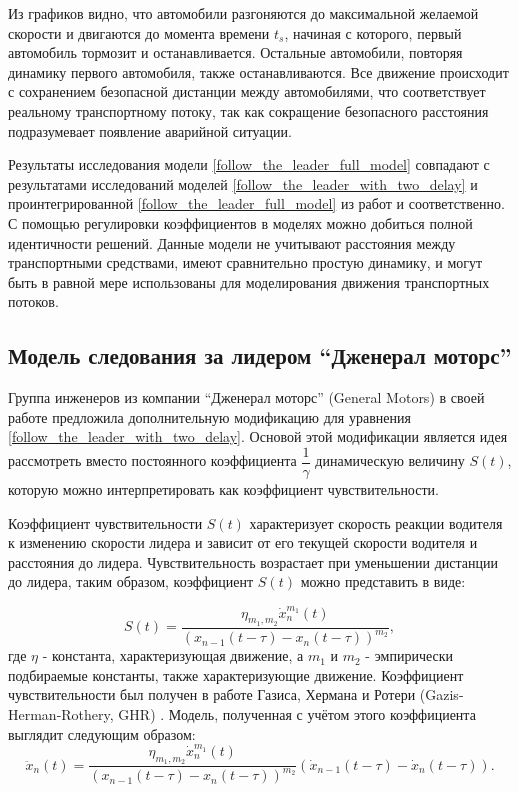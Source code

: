 \documentclass[12pt, a4paper]{extarticle}
\numberwithin{equation}{section}
\numberwithin{figure}{section}
\begin{document}
Из графиков видно, что автомобили разгоняются до максимальной желаемой скорости и двигаются до момента времени $t_s$, начиная с которого, первый автомобиль тормозит и останавливается. Остальные автомобили, повторяя динамику первого автомобиля, также останавливаются. Все движение происходит с сохранением безопасной дистанции между автомобилями, что соответствует реальному транспортному потоку, так как сокращение безопасного расстояния подразумевает появление аварийной ситуации.

Результаты исследования модели \eqref{follow_the_leader_full_model} совпадают с  результатами исследований моделей \eqref{follow_the_leader_with_two_delay} и проинтегрированной \eqref{follow_the_leader_full_model} из работ \cite{RefineFirstFollowTheLeaderModel} и \cite{Course} соответственно. С помощью регулировки коэффициентов в моделях можно добиться полной идентичности решений. Данные модели не учитывают расстояния между транспортными средствами, имеют сравнительно простую динамику, и могут быть в равной мере использованы для моделирования движения транспортных потоков. 

\subsection{Модель следования за лидером ``Дженерал моторс''}

Группа инженеров из компании ``Дженерал моторс'' (General Motors) в своей работе \cite{GazisModel} предложила дополнительную модификацию для уравнения  \eqref{follow_the_leader_with_two_delay}. Основой этой модификации является идея рассмотреть вместо постоянного коэффициента $\dfrac{1}{\gamma}$ динамическую величину $S(t)$, которую можно интерпретировать как коэффициент чувствительности. 

Коэффициент чувствительности $S(t)$ характеризует скорость реакции водителя к изменению скорости лидера и зависит от его текущей скорости водителя и расстояния до лидера. Чувствительность возрастает при уменьшении дистанции до лидера, таким образом, коэффициент $S(t)$ можно представить в виде:

\begin{equation} \label{gazis_coefficient}
S(t) = \dfrac{\eta_{m_1,m_2}\dot{x}_n^{m_1}(t)}{(x_{n-1}(t-\tau)-x_n(t-\tau))^{m_2}},
\end{equation}
где $\eta$ - константа, характеризующая движение, а $m_1$ и $m_2$ - эмпирически подбираемые константы, также характеризующие движение. Коэффициент чувствительности был получен в работе Газиса, Хермана и Ротери (Gazis-Herman-Rothery, GHR)  \cite{GazisModel}. Модель, полученная с учётом этого коэффициента выглядит следующим образом:   
\begin{equation} \label{gazis_model}
\ddot{x}_n(t) = \dfrac{\eta_{m_1,m_2}\dot{x}_n^{m_1}(t)}{(x_{n-1}(t-\tau)-x_n(t-\tau))^{m_2}} (\dot{x}_{n-1}(t-\tau) - \dot{x}_{n}(t-\tau)).
\end{equation}
\end{document}
